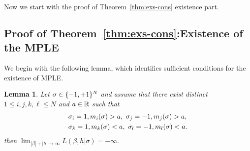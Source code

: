 \documentclass[letterpaper,11pt,reqno]{amsart}
\newtheorem{lem}[thm]{Lemma}
\renewcommand{\le}{\leqslant}
\renewcommand{\ge}{\geqslant}
\renewcommand{\leq}{\leqslant}
\newcommand{\mvgs}{{\sigma}}
\newcommand{\mvgt}{{\tau}}
\DeclareMathOperator{\E}{\mathds{E}}
\begin{document}

Now we start with the proof of Theorem~\ref{thm:exs-cons} existence part. 
\subsection{Proof of Theorem~\ref{thm:exs-cons}:Existence of the MPLE}\label{sec2.2}
We begin with the following lemma, which identifies sufficient conditions for the existence of MPLE.

\begin{lem}\label{fix:prop}
	Let $\sigma \in \{-1, +1\}^N$ and assume that there exist distinct $1 \le i, j, k, \ell \le N$ and $a \in \mathbb{R}$ such that
    \begin{align} \label{suff_cond}
    \begin{split}
        & \gs_i = 1, m_i(\mvgs) >a, \,\, \gs_j = -1,  m_j(\mvgs) > a, \\
        & \gs_k = 1,  m_k(\mvgs) < a, \,\,\gs_l = -1,  m_l(\mvgs) < a.
        \end{split}
    \end{align}
	then  $\lim_{ |\beta| + |h| \to \infty} \bar L(\beta, h| \sigma)  =  - \infty.$
\end{lem}
\end{document}
